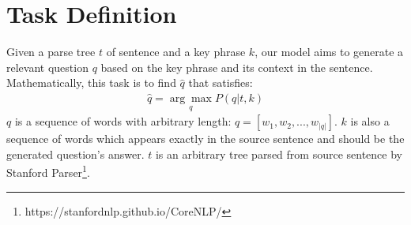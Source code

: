 \section{Task Definition}
Given a parse tree $t$ of sentence and a key phrase $k$, our model aims to generate a relevant question $q$ based on the key phrase and its context in the sentence. Mathematically, this task is to find $\hat{q}$ that satisfies:
\begin{eqnarray}
\hat{q} = \underset{q}{\arg \max} P(q|t, k)
\end{eqnarray}
$q$ is a sequence of words with arbitrary length: $q = [w_1, w_2, ..., w_{|q|}]$. $k$ is also a sequence of words which appears exactly in the source sentence and should be the generated question's answer. $t$ is an arbitrary tree parsed from source sentence by Stanford Parser\footnote{https://stanfordnlp.github.io/CoreNLP/}.